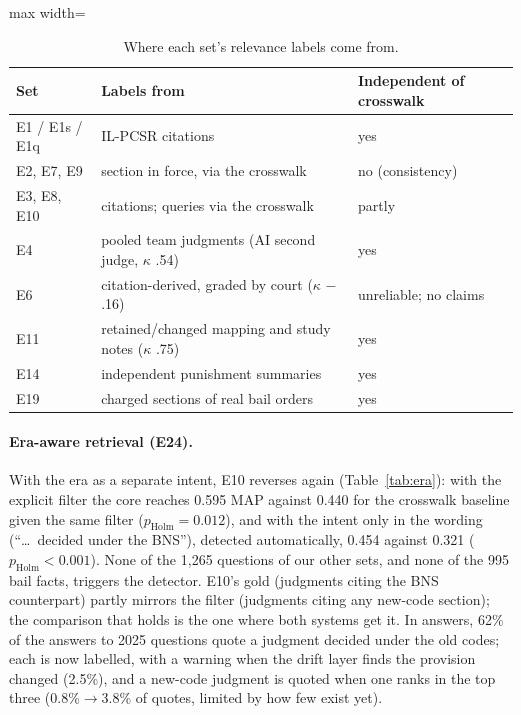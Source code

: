 \documentclass[sigconf,nonacm]{acmart}
\newcommand{\ph}{p_{\text{Holm}}}
\begin{document}
\begin{table}[t]
\centering\small
\caption{Where each set's relevance labels come from.}
\label{tab:provenance}
\begin{adjustbox}{max width=\linewidth}
\begin{tabular}{lll}
\toprule
Set & Labels from & Independent of crosswalk \\
\midrule
E1 / E1s / E1q & IL-PCSR citations & yes \\
E2, E7, E9 & section in force, via the crosswalk & no (consistency) \\
E3, E8, E10 & citations; queries via the crosswalk & partly \\
E4 & pooled team judgments (AI second judge, $\kappa$ .54) & yes \\
E6 & citation-derived, graded by court ($\kappa$ $-$.16) & unreliable; no claims \\
E11 & retained/changed mapping and study notes ($\kappa$ .75) & yes \\
E14 & independent punishment summaries & yes \\
E19 & charged sections of real bail orders & yes \\
\bottomrule
\end{tabular}
\end{adjustbox}
\end{table}

\paragraph{Era-aware retrieval (E24).} With the era as a separate intent, E10 reverses again
(Table~\ref{tab:era}): with the explicit filter the core reaches 0.595 MAP against 0.440 for the
crosswalk baseline given the same filter ($\ph=0.012$), and with the intent only in the wording
(``\ldots\ decided under the BNS''), detected automatically, 0.454 against 0.321 ($\ph<0.001$).
None of the 1,265 questions of our other sets, and none of the 995 bail facts, triggers the
detector. E10's gold (judgments citing the BNS counterpart) partly mirrors the filter (judgments
citing any new-code section); the comparison that holds is the one where both systems get it.
In answers, 62\% of the answers to 2025 questions quote a judgment decided under the old codes;
each is now labelled, with a warning when the drift layer finds the provision changed (2.5\%), and
a new-code judgment is quoted when one ranks in the top three (0.8\%$\to$3.8\% of quotes, limited by
how few exist yet).
\end{document}
